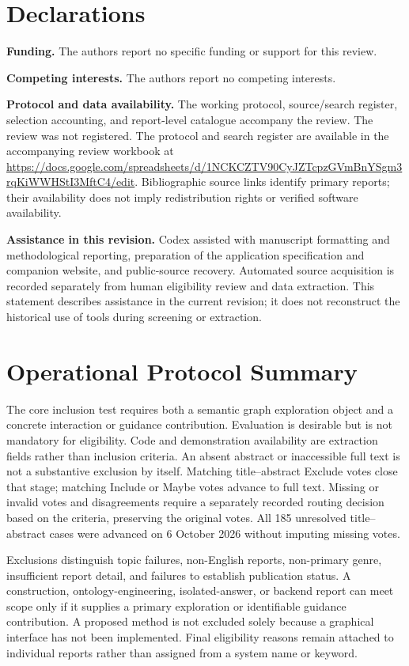 \documentclass[manuscript,review,screen]{acmart}
\begin{document}
\section*{Declarations}
\textbf{Funding.} The authors report no specific funding or support for this review.

\noindent\textbf{Competing interests.} The authors report no competing interests.

\noindent\textbf{Protocol and data availability.} The working protocol, source/search register, selection accounting, and report-level catalogue accompany the review. The review was not registered. The protocol and search register are available in the accompanying review workbook at \url{https://docs.google.com/spreadsheets/d/1NCKCZTV90CyJZTcpzGVmBnYSgm3rqKiWWHStI3MftC4/edit}. Bibliographic source links identify primary reports; their availability does not imply redistribution rights or verified software availability.

\noindent\textbf{Assistance in this revision.} Codex assisted with manuscript formatting and methodological reporting, preparation of the application specification and companion website, and public-source recovery. Automated source acquisition is recorded separately from human eligibility review and data extraction. This statement describes assistance in the current revision; it does not reconstruct the historical use of tools during screening or extraction.

\appendix
\section{Operational Protocol Summary}\label{app:protocol}
The core inclusion test requires both a semantic graph exploration object and a concrete interaction or guidance contribution. Evaluation is desirable but is not mandatory for eligibility. Code and demonstration availability are extraction fields rather than inclusion criteria. An absent abstract or inaccessible full text is not a substantive exclusion by itself. Matching title--abstract Exclude votes close that stage; matching Include or Maybe votes advance to full text. Missing or invalid votes and disagreements require a separately recorded routing decision based on the criteria, preserving the original votes. All 185 unresolved title--abstract cases were advanced on 6 October 2026 without imputing missing votes.

Exclusions distinguish topic failures, non-English reports, non-primary genre, insufficient report detail, and failures to establish publication status. A construction, ontology-engineering, isolated-answer, or backend report can meet scope only if it supplies a primary exploration or identifiable guidance contribution. A proposed method is not excluded solely because a graphical interface has not been implemented. Final eligibility reasons remain attached to individual reports rather than assigned from a system name or keyword.
\end{document}
